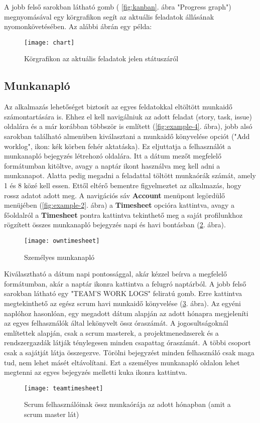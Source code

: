 A jobb felső sarokban látható gomb ( \ref{fig:kanban}. ábra "Progress graph") megnyomásával egy körgrafikon segít az aktuális feladatok állásának nyomonkövetésében. Az alábbi ábrán egy példa:

\begin{figure}[H]
	\centering
	\texttt{[image: chart]}
	\caption{Körgrafikon az aktuális feladatok jelen státuszáról}
	\label{fig:kanbanchart}
\end{figure}

\pagebreak

\subsection{Munkanapló}
\label{worklog}

Az alkalmazás lehetőséget biztosít az egyes feldatokkal eltöltött munkaidő számontartására is. Ehhez el kell navigálniuk az adott feladat (story, task, issue) oldalára és a már korábban többször is említett (\ref{fig:example-4}. ábra), jobb alsó sarokban található almenüben kiválasztani a munkaidő könyvelése opciót ("Add worklog", ikon: kék körben fehér aktatáska). Ez eljuttatja a felhasználót a munkanapló bejegyzés létrehozó oldalára. Itt a dátum mezőt megfelelő formátumban kitöltve, avagy a naptár ikont használva meg kell adni a munkanapot. Alatta pedig megadni a feladattal töltött munkaórák számát, amely 1 és 8 közé kell essen. Ettől eltérő bementre figyelmeztet az alkalmazás, hogy rossz adatot adott meg. A navigációs sáv \textbf{Account} menüpont legördülő menüjében (\ref{fig:example-2}. ábra) a \textbf{Timesheet} opcióra kattintva, avagy a főoldalról a \textbf{Timesheet} pontra kattintva tekinthető meg a saját profilunkhoz rögzített összes munkanapló bejegyzés napi és havi bontásban (\ref{fig:personaltimesheet}. ábra).

\begin{figure}[H]
	\centering
	\texttt{[image: owntimesheet]}
	\caption{Személyes munkanapló}
	\label{fig:personaltimesheet}
\end{figure}

Kiválasztható a dátum napi pontossággal, akár kézzel beírva a megfelelő formátumban, akár a naptár ikonra kattintva a felugró naptárból. A jobb felső sarokban látható egy "TEAM'S WORK LOGS" feliratú gomb. Erre kattintva megtekinthető az egész scrum havi munkaidő könyvelése (\ref{fig:teamtimesheet}. ábra). Az egyéni naplóhoz hasonlóan, egy megadott dátum alapján az adott hónapra megjeleníti az egyes felhasználók által lekönyvelt össz óraszámát. A jogosultságoknál említettek alapján, csak a scrum masterek, a projektmenedzserek és a rendszergazdák látják ténylegesen minden csapattag óraszámát. A többi csoport csak a sajátját látja összegezve. Törölni bejegyzést minden felhasználó csak maga tud, nem lehet másét eltávolítani. Ezt a személyes munkanapló oldalon lehet megtenni az egyes bejegyzés melletti kuka ikonra kattintva.

\begin{figure}[H]
	\centering
	\texttt{[image: teamtimesheet]}
	\caption{Scrum felhasználóinak össz munkaórája az adott hónapban (amit a scrum master lát)}
	\label{fig:teamtimesheet}
\end{figure}

\newpage
